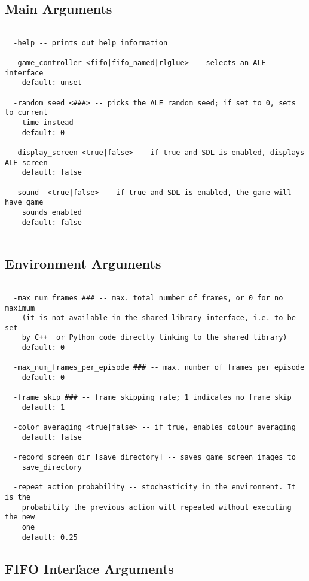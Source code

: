 \documentclass[12pt]{article}
\begin{document}
\subsection{Main Arguments}
\small{
\begin{verbatim}

  -help -- prints out help information

  -game_controller <fifo|fifo_named|rlglue> -- selects an ALE interface
    default: unset

  -random_seed <###> -- picks the ALE random seed; if set to 0, sets to current 
    time instead 
    default: 0 

  -display_screen <true|false> -- if true and SDL is enabled, displays ALE screen
    default: false
    
  -sound  <true|false> -- if true and SDL is enabled, the game will have game
    sounds enabled
    default: false


\end{verbatim}
}

\subsection{Environment Arguments}

\small{
\begin{verbatim}

  -max_num_frames ### -- max. total number of frames, or 0 for no maximum 
    (it is not available in the shared library interface, i.e. to be set 
    by C++  or Python code directly linking to the shared library)
    default: 0

  -max_num_frames_per_episode ### -- max. number of frames per episode
    default: 0

  -frame_skip ### -- frame skipping rate; 1 indicates no frame skip 
    default: 1

  -color_averaging <true|false> -- if true, enables colour averaging 
    default: false

  -record_screen_dir [save_directory] -- saves game screen images to
    save_directory
     
  -repeat_action_probability -- stochasticity in the environment. It is the
    probability the previous action will repeated without executing the new
    one
    default: 0.25
\end{verbatim}
}

\subsection{FIFO Interface Arguments}
\end{document}
